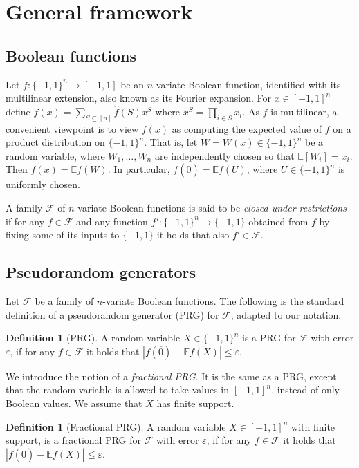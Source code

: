 \documentclass[11pt]{article}
\numberwithin{equation}{section}
\theoremstyle{definition}
\newtheorem{definition}[theorem]{Definition}
\theoremstyle{plain}
\newcommand{\E}{\mathbb{E}}
\newcommand{\FF}{\mathcal{F}}
\newcommand{\eps}{\varepsilon}
\newcommand{\zero}{\overline{0}}
\begin{document}
\section{General framework}
\label{sec:framework}

\subsection{Boolean functions}
Let $f:\{-1,1\}^n \to [-1,1]$ be an $n$-variate Boolean function, identified with its multilinear extension,
also known as its Fourier expansion. For $x \in [-1,1]^n$ define $f(x) = \sum_{S \subseteq [n]} \hat{f}(S)x^S$ where  $x^S = \prod_{i \in S} x_i$.
As $f$ is multilinear, a convenient viewpoint is to view $f(x)$ as computing the expected value of $f$ on a product distribution on $\{-1,1\}^n$. That is, let $W=W(x) \in \{-1,1\}^n$ be a random variable, where $W_1,\ldots,W_n$ are independently chosen so that $\E[W_i]=x_i$. Then $f(x)=\E f(W)$. In particular, $f(\zero) = \E f(U)$, where $U \in \{-1,1\}^n$ is uniformly chosen.

A family $\FF$ of $n$-variate Boolean functions
is said to be \emph{closed under restrictions} if for any $f \in \FF$ and any function
$f':\{-1,1\}^n \to \{-1,1\}$ obtained from $f$ by fixing some of its inputs to $\{-1,1\}$ it holds that also $f' \in \FF$.

\subsection{Pseudorandom generators}

Let $\FF$ be a family of $n$-variate Boolean functions. The following is the standard definition of a
pseudorandom generator (PRG) for $\FF$, adapted to our notation.

\begin{definition}[PRG]
A random variable $X \in \{-1,1\}^n$ is a PRG for $\FF$ with error $\eps$, if for any $f \in \FF$ it holds that
$\left| f(\zero) - \E f(X) \right| \le \eps$.
\end{definition}

We introduce the notion of a \emph{fractional PRG}. It is the same as a PRG, except that the random variable is allowed to take  values in $[-1,1]^n$,
instead of only Boolean values. We assume that $X$ has finite support.
 
\begin{definition}[Fractional PRG]
A random variable $X \in [-1,1]^n$ with finite support, is a fractional PRG for $\FF$ with error $\eps$, if for any $f \in \FF$ it holds that
$\left| f(\zero) - \E f(X) \right| \le \eps$.
\end{definition}
\end{document}
